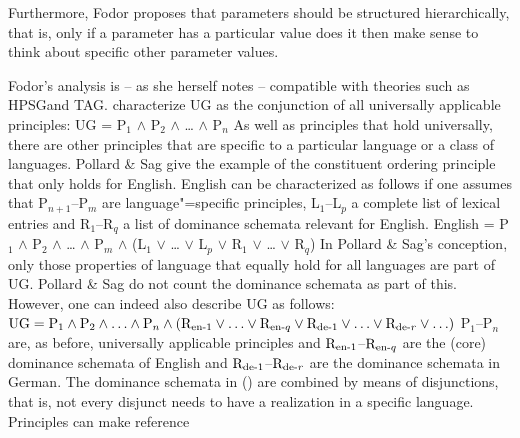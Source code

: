 Furthermore, Fodor proposes that parameters should be structured hierarchically, that is, only if a parameter has a particular value
does it then make sense to think about specific other parameter values.

Fodor's analysis is -- as she herself notes \citep[]{Fodor2001a} -- compatible with theories such as HPSG\indexhpsg and TAG\indextag.
\citet[]{ps} characterize UG as the conjunction of all universally applicable principles:
\ea
UG = P$_1$ $\wedge$ P$_2$ $\wedge$ \ldots{} $\wedge$ P$_n$
\z
As well as principles that hold universally, there are other principles that are specific to a particular language
or a class of languages. Pollard \& Sag give the example of the constituent ordering principle that only holds for English.
English can be characterized as follows if one assumes that P$_{n + 1}$--P$_m$ are language"=specific principles,  
L$_{1}$--L$_p$ a complete list of lexical entries and R$_{1}$--R$_q$ a list of dominance schemata relevant for English.
\ea
English = P$_1$ $\wedge$ P$_2$ $\wedge$ \ldots{} $\wedge$ P$_m$ $\wedge$ (L$_{1}$ $\vee$ \ldots{}
$\vee$ L$_p$ $\vee$ R$_{1}$ $\vee$ \ldots{} $\vee$  R$_q$)
\z
In Pollard \& Sag's conception, only those properties of language that equally hold for all languages are
part of UG. Pollard \& Sag do not count the dominance schemata as part of this. However, one can indeed also describe
UG as follows:
\ea
$
\mathrm{UG} = 
  \mathrm{P}_1 
  \wedge 
  \mathrm{P}_2 
  \wedge 
  \ldots 
  \wedge 
  \mathrm{P}_n 
  \wedge
              (\mathrm{R}_{\mathrm{en}\mathdash1} 
              \vee 
              \ldots 
              \vee 
              \mathrm{R}_{\mathrm{en}\mathdash q} 
              \vee  
              \mathrm{R}_{\mathrm{de}\mathdash1} 
              \vee 
              \ldots 
              \vee 
              \mathrm{R}_{\mathrm{de}\mathdash r}
	      \vee 
	      \ldots)
$
\z
\largerpage
P$_1$--P$_n$ are, as before, universally applicable principles and
$\mathrm{R}_{\mathrm{en}\text{\normalfont -}1}$--$\mathrm{R}_{\mathrm{en}\text{\normalfont -} q}$ are the
(core) dominance schemata of English and $\mathrm{R}_{\mathrm{de}\text{\normalfont -}1}$--$\mathrm{R}_{\mathrm{de}\text{\normalfont -} r}$ are the dominance schemata in
German. The dominance schemata in () are combined by means of disjunctions, that is, not every disjunct needs to have a realization in a specific language. Principles can make reference

